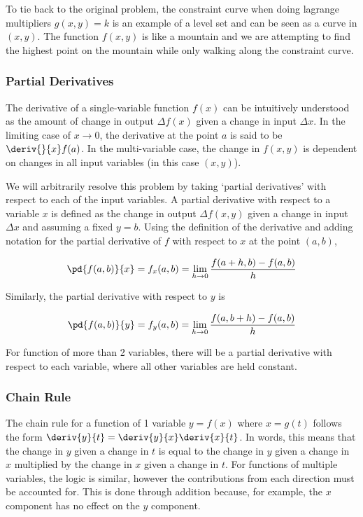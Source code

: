 \documentclass{notes}
\begin{document}
To tie back to the original problem, the constraint curve when doing lagrange multipliers \(g(x, y) = k\) is an example of a level set and can be seen as a curve in \((x, y)\). The function \(f(x, y)\) is like a mountain and we are attempting to find the highest point on the mountain while only walking along the constraint curve.

\subsubsection*{Partial Derivatives}

The derivative of a single-variable function \(f(x)\) can be intuitively understood as the amount of change in output \(\Delta f(x)\) given a change in input \(\Delta x\). In the limiting case of \(x \rightarrow 0\), the derivative at the point \(a\) is said to be \(\deriv{}{x}f(a)\). In the multi-variable case, the change in \(f(x, y)\) is dependent on changes in all input variables (in this case \((x, y)\)).

We will arbitrarily resolve this problem by taking `partial derivatives' with respect to each of the input variables. A partial derivative with respect to a variable \(x\) is defined as the change in output \(\Delta f(x, y)\) given a change in input \(\Delta x\) and assuming a fixed \(y=b\). Using the definition of the derivative and adding notation for the partial derivative of \(f\) with respect to \(x\) at the point \((a, b)\),

\[\pd{f(a, b)}{x} = f_x(a, b) = \lim_{h \to 0} \frac{f(a+h, b) - f(a, b)}{h}\]

Similarly, the partial derivative with respect to \(y\) is

\[\pd{f(a, b)}{y} = f_y(a, b) = \lim_{h \to 0} \frac{f(a, b+h) - f(a, b)}{h}\]

For function of more than 2 variables, there will be a partial derivative with respect to each variable, where all other variables are held constant.

\subsubsection*{Chain Rule}

The chain rule for a function of 1 variable \(y = f(x)\) where \(x = g(t)\) follows the form \(\deriv{y}{t} = \deriv{y}{x}\deriv{x}{t}\). In words, this means that the change in \(y\) given a change in \(t\) is equal to the change in \(y\) given a change in \(x\) multiplied by the change in \(x\) given a change in \(t\). For functions of multiple variables, the logic is similar, however the contributions from each direction must be accounted for. This is done through addition because, for example, the \(x\) component has no effect on the \(y\) component.
\end{document}
